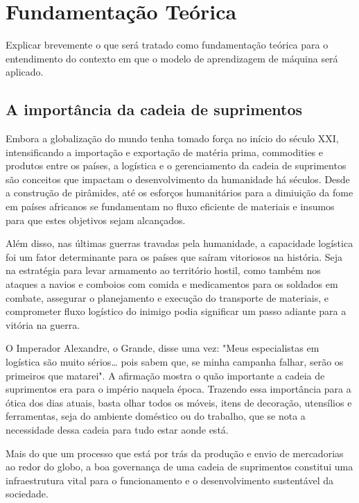 \chapter{Fundamentação Teórica}\label{cap:fundamentacaoTeorica}
Explicar brevemente o que será tratado como fundamentação teórica para o entendimento do contexto em que o modelo de aprendizagem de máquina será aplicado.

\section{A importância da cadeia de suprimentos}

Embora a globalização do mundo tenha tomado força no início do século XXI, intensificando a importação e exportação de matéria prima, commodities e produtos entre os países, a logística e o gerenciamento da cadeia de suprimentos são conceitos que impactam o desenvolvimento da humanidade há séculos. Desde a construção de pirâmides, até os esforços humanitários para a dimiuição da fome em países africanos se fundamentam no fluxo eficiente de materiais e insumos para que estes objetivos sejam alcançados.

Além disso, nas últimas guerras travadas pela humanidade, a capacidade logística foi um fator determinante para os países que saíram vitoriosos na história. Seja na estratégia para levar armamento ao território hostil, como também nos ataques a navios e comboios com comida e medicamentos para os soldados em combate, assegurar o planejamento e execução do transporte de materiais, e comprometer fluxo logístico do inimigo podia significar um passo adiante para a vitória na guerra. 

O Imperador Alexandre, o Grande, disse uma vez: "Meus especialistas em logística são muito sérios… pois sabem que, se minha campanha falhar, serão os primeiros que matarei". A afirmação mostra o quão importante a cadeia de suprimentos era para o império naquela época. Trazendo essa importância para a ótica dos dias atuais, basta olhar todos os móveis, itens de decoração, utensílios e ferramentas, seja do ambiente doméstico ou do trabalho, que se nota a necessidade dessa cadeia para tudo estar aonde está.

Mais do que um processo que está por trás da produção e envio de mercadorias ao redor do globo, a boa governança de uma cadeia de suprimentos constitui uma infraestrutura vital para o funcionamento e o desenvolvimento sustentável da sociedade.

